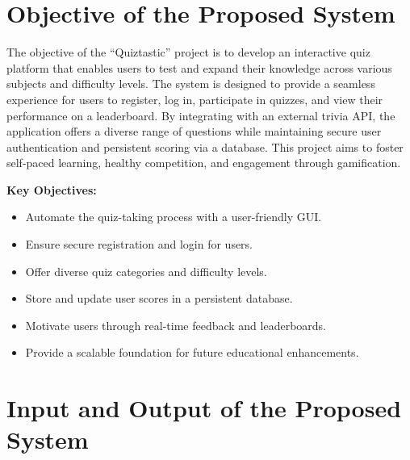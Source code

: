 \documentclass[12pt,a4paper]{article}
\begin{document}

\maketitle


\section{Objective of the Proposed System}

The objective of the ``Quiztastic'' project is to develop an interactive quiz platform that enables users to test and expand their knowledge across various subjects and difficulty levels. The system is designed to provide a seamless experience for users to register, log in, participate in quizzes, and view their performance on a leaderboard. By integrating with an external trivia API, the application offers a diverse range of questions while maintaining secure user authentication and persistent scoring via a database. This project aims to foster self-paced learning, healthy competition, and engagement through gamification.

\textbf{Key Objectives:}
\begin{itemize}
    \item Automate the quiz-taking process with a user-friendly GUI.
    \item Ensure secure registration and login for users.
    \item Offer diverse quiz categories and difficulty levels.
    \item Store and update user scores in a persistent database.
    \item Motivate users through real-time feedback and leaderboards.
    \item Provide a scalable foundation for future educational enhancements.
\end{itemize}

\section{Input and Output of the Proposed System}
\end{document}
